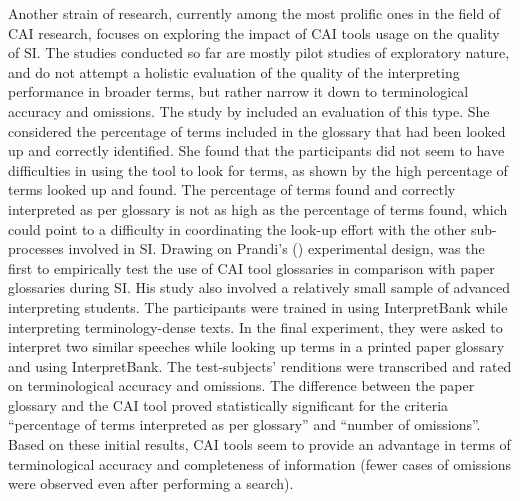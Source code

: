 Another strain of research, currently among the most prolific ones in the field of CAI research, focuses on exploring the impact of CAI tools usage on the quality of SI. The studies conducted so far are mostly pilot studies of exploratory nature, and do not attempt a holistic evaluation of the quality of the interpreting performance in broader terms, but rather narrow it down to terminological accuracy and omissions. The study by \citet{prandi_uso_2015,prandi_use_2015} included an evaluation of this type. She considered the percentage of terms included in the glossary that had been looked up and correctly identified. She found that the participants did not seem to have difficulties in using the tool to look for terms, as shown by the high percentage of terms looked up and found. The percentage of terms found and correctly interpreted as per glossary is not as high as the percentage of terms found, which could point to a difficulty in coordinating the look-up effort with the other sub-processes involved in SI. Drawing on Prandi's (\citeyear{prandi_uso_2015,prandi_use_2015}) experimental design, \citet{biagini_glossario_2015} was the first to empirically test the use of CAI tool glossaries in comparison with paper glossaries during SI. His study also involved a relatively small sample of advanced interpreting students. The participants were trained in using InterpretBank while interpreting terminology-dense texts. In the final experiment, they were asked to interpret two similar speeches while looking up terms in a printed paper glossary and using InterpretBank. The test-subjects' renditions were transcribed and rated on terminological accuracy and omissions. The difference between the paper glossary and the CAI tool proved statistically significant for the criteria ``percentage of terms interpreted as per glossary'' and ``number of omissions''. Based on these initial results, CAI tools seem to provide an advantage in terms of terminological accuracy and completeness of information (fewer cases of omissions were observed even after performing a search).

